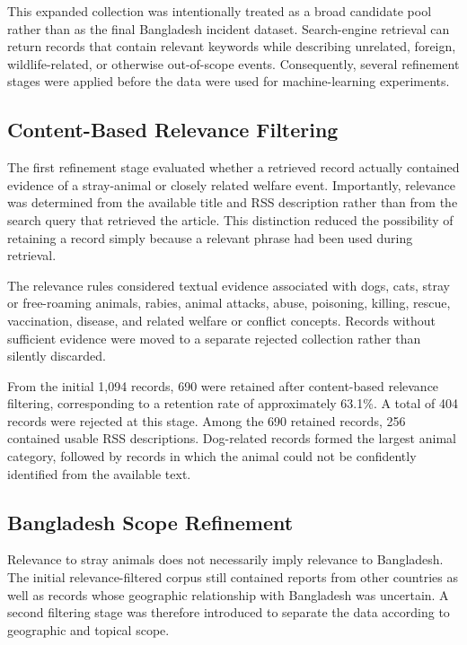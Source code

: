 \documentclass[conference]{IEEEtran}
\begin{document}
This expanded collection was intentionally treated as a broad candidate pool
rather than as the final Bangladesh incident dataset. Search-engine retrieval
can return records that contain relevant keywords while describing unrelated,
foreign, wildlife-related, or otherwise out-of-scope events. Consequently,
several refinement stages were applied before the data were used for
machine-learning experiments.

\subsection{Content-Based Relevance Filtering}

The first refinement stage evaluated whether a retrieved record actually
contained evidence of a stray-animal or closely related welfare event.
Importantly, relevance was determined from the available title and RSS
description rather than from the search query that retrieved the article.
This distinction reduced the possibility of retaining a record simply because
a relevant phrase had been used during retrieval.

The relevance rules considered textual evidence associated with dogs, cats,
stray or free-roaming animals, rabies, animal attacks, abuse, poisoning,
killing, rescue, vaccination, disease, and related welfare or conflict
concepts. Records without sufficient evidence were moved to a separate
rejected collection rather than silently discarded.

From the initial 1,094 records, 690 were retained after content-based
relevance filtering, corresponding to a retention rate of approximately
63.1\%. A total of 404 records were rejected at this stage. Among the 690
retained records, 256 contained usable RSS descriptions. Dog-related records
formed the largest animal category, followed by records in which the animal
could not be confidently identified from the available text.

\subsection{Bangladesh Scope Refinement}

Relevance to stray animals does not necessarily imply relevance to
Bangladesh. The initial relevance-filtered corpus still contained reports
from other countries as well as records whose geographic relationship with
Bangladesh was uncertain. A second filtering stage was therefore introduced
to separate the data according to geographic and topical scope.
\end{document}

